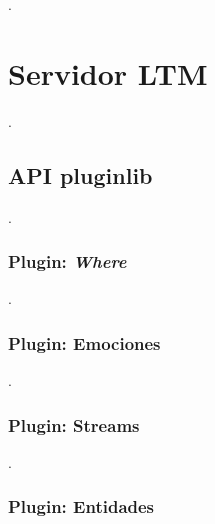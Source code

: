.

\section{Servidor LTM}

.

\subsection{API pluginlib}

.
\subsubsection{Plugin: \textit{Where}}

.
\subsubsection{Plugin: Emociones}

.
\subsubsection{Plugin: Streams}

.
\subsubsection{Plugin: Entidades}

